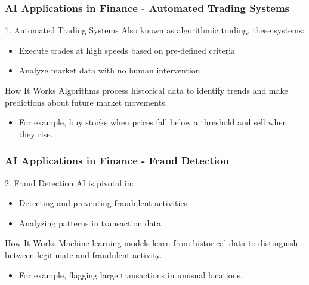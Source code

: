 \documentclass[aspectratio=169]{beamer}
\begin{document}
\begin{frame}[fragile]
    \frametitle{AI Applications in Finance - Automated Trading Systems}
    \begin{block}{1. Automated Trading Systems}
        Also known as algorithmic trading, these systems:
        \begin{itemize}
            \item Execute trades at high speeds based on pre-defined criteria
            \item Analyze market data with no human intervention
        \end{itemize}
        \begin{block}{How It Works}
            Algorithms process historical data to identify trends and make predictions about future market movements.
            \begin{itemize}
                \item For example, buy stocks when prices fall below a threshold and sell when they rise.
            \end{itemize}
        \end{block}
    \end{block}
\end{frame}

\begin{frame}[fragile]
    \frametitle{AI Applications in Finance - Fraud Detection}
    \begin{block}{2. Fraud Detection}
        AI is pivotal in:
        \begin{itemize}
            \item Detecting and preventing fraudulent activities
            \item Analyzing patterns in transaction data
        \end{itemize}
        \begin{block}{How It Works}
            Machine learning models learn from historical data to distinguish between legitimate and fraudulent activity.
            \begin{itemize}
                \item For example, flagging large transactions in unusual locations.
            \end{itemize}
        \end{block}
    \end{block}
\end{frame}
\end{document}
